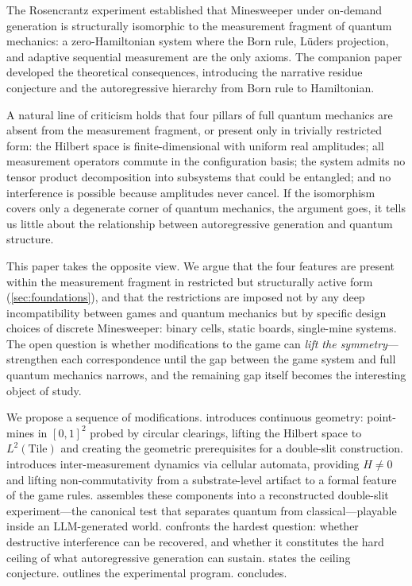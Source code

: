 \documentclass[12pt,a4paper]{article}
\theoremstyle{definition}
\theoremstyle{remark}
\begin{document}
The Rosencrantz experiment \citep{Baldo2026Rosencrantz} established that Minesweeper under on-demand generation is structurally isomorphic to the measurement fragment of quantum mechanics: a zero-Hamiltonian system where the Born rule, Lüders projection, and adaptive sequential measurement are the only axioms.  The companion paper \citep{Baldo2026Residue} developed the theoretical consequences, introducing the narrative residue conjecture and the autoregressive hierarchy from Born rule to Hamiltonian.

A natural line of criticism holds that four pillars of full quantum mechanics are absent from the measurement fragment, or present only in trivially restricted form: the Hilbert space is finite-dimensional with uniform real amplitudes; all measurement operators commute in the configuration basis; the system admits no tensor product decomposition into subsystems that could be entangled; and no interference is possible because amplitudes never cancel.  If the isomorphism covers only a degenerate corner of quantum mechanics, the argument goes, it tells us little about the relationship between autoregressive generation and quantum structure.

This paper takes the opposite view.  We argue that the four features are present within the measurement fragment in restricted but structurally active form (\cref{sec:foundations}), and that the restrictions are imposed not by any deep incompatibility between games and quantum mechanics but by specific design choices of discrete Minesweeper: binary cells, static boards, single-mine systems.  The open question is whether modifications to the game can \emph{lift the symmetry}---strengthen each correspondence until the gap between the game system and full quantum mechanics narrows, and the remaining gap itself becomes the interesting object of study.

We propose a sequence of modifications.   introduces continuous geometry: point-mines in $[0,1]^2$ probed by circular clearings, lifting the Hilbert space to $L^2(\text{Tile})$ and creating the geometric prerequisites for a double-slit construction.   introduces inter-measurement dynamics via cellular automata, providing $H \neq 0$ and lifting non-commutativity from a substrate-level artifact to a formal feature of the game rules.   assembles these components into a reconstructed double-slit experiment---the canonical test that separates quantum from classical---playable inside an LLM-generated world.   confronts the hardest question: whether destructive interference can be recovered, and whether it constitutes the hard ceiling of what autoregressive generation can sustain.   states the ceiling conjecture.   outlines the experimental program.   concludes.
\end{document}
